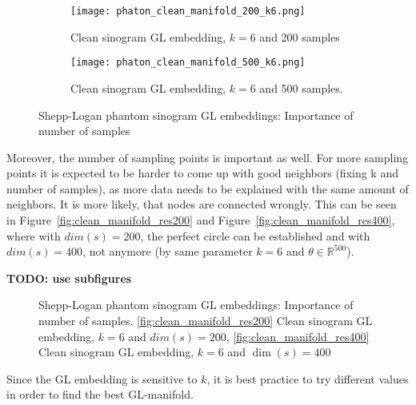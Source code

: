 \begin{figure}[H]
    \captionsetup[subfigure]{justification=centering}
    \centering
    \begin{subfigure}[t]{0.45\textwidth}
        \texttt{[image: phaton\_clean\_manifold\_200\_k6.png]}
        \caption{Clean sinogram GL embedding, $k = 6$ and 200 samples}
        \label{fig:clean_manifold_200}
    \end{subfigure}\hfill
    \begin{subfigure}[t]{0.45\textwidth}
      \texttt{[image: phaton\_clean\_manifold\_500\_k6.png]}
      \caption{Clean sinogram GL embedding, $k = 6$ and 500 samples.}
      \label{fig:clean_manifold_500}
    \end{subfigure}\hfill
    \caption{Shepp-Logan phantom sinogram GL embeddings: Importance of number of samples}
  \end{figure}


Moreover, the number of sampling points is important as well.
For more sampling points it is expected to be harder to come up with good neighbors (fixing k and number of samples),
as more data needs to be explained with the same amount of neighbors. It is more likely, that nodes are connected wrongly.
This can be seen in Figure~\ref{fig:clean_manifold_res200} and Figure~\ref{fig:clean_manifold_res400}, where with $dim(s) = 200$,
the perfect circle can be established and with $dim(s) = 400$, not anymore (by same parameter $k = 6$ and $\theta \in \mathbb{R}^{500}$).

\textbf{TODO: use subfigures}

\begin{figure}[H]
    \centering
    \hfill
    \hfill
    \hfill
    \caption{Shepp-Logan phantom sinogram GL embeddings: Importance of number of samples.
    \ref{fig:clean_manifold_res200} Clean sinogram GL embedding, $k = 6$ and $dim(s)=200$,
    \ref{fig:clean_manifold_res400} Clean sinogram GL embedding, $k = 6$ and $\dim(s)=400$}
\end{figure}


\begin{tcolorbox}[colback=red!5!white,colframe=red!75!black]
    Since the GL embedding is sensitive to $k$, it is best practice to try different values in order to find the best GL-manifold.
\end{tcolorbox}





